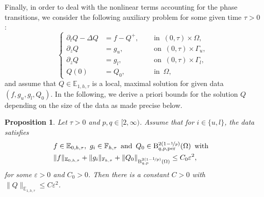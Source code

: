 \documentclass[10pt]{amsart}
\theoremstyle{plain}
\newtheorem{prop}[prop]{Proposition}
\theoremstyle{definition}
\theoremstyle{thm}
\numberwithin{equation}{section}
\newcommand{\rB}{\mathrm{B}}
\newcommand{\E}{\mathbb{E}}
\newcommand{\F}{\mathbb{F}}
\newcommand{\del}{\partial}
\newcommand{\per}{\mathrm{per}}
\newcommand{\dz}{\del_z}
\newcommand{\dt}{\del_t}
\newcommand{\eps}{\varepsilon}
\newcommand{\Gal}{\Gamma_l}
\newcommand{\Gau}{\Gamma_u}
\newcommand{\tand}{\enspace \text{and} \enspace}
\newcommand{\ton}{\enspace \text{on} \enspace}
\newcommand{\tin}{\enspace \text{in} \enspace}
\newcommand{\twith}{\enspace \text{with} \enspace}
\begin{document}
Finally, in order to deal with the nonlinear terms accounting for the phase transitions, we consider the following auxiliary problem for some given time $\tau>0$:
\begin{equation}\label{eq: auxillary for q}
    \left\{
    \begin{aligned}
        \dt Q - \Delta Q
        &= f -Q^+, &&\tin (0,\tau) \times \Omega,\\
        \dz Q
        &= g_u, &&\ton (0,\tau) \times \Gau,\\
       \dz Q
        &= g_l, &&\ton (0,\tau) \times \Gal,\\
        Q(0)
        &= Q_0, &&\tin \Omega,
    \end{aligned}
    \right.
\end{equation}
and assume that $Q \in \E_{1,h,\tau}$ is a local, maximal solution for given data $(f,g_u,g_l,Q_0)$. 
In the following, we derive a priori bounds for the solution $Q$ depending on the size of the data as made precise below.

\begin{prop}
    \label{prop: est on q}
    Let $\tau >0$ and $p,q \in [2,\infty)$. Assume that for $i \in \{ u,l\}$, the data satisfies
    \begin{equation}\label{eq: assu q}
        \begin{aligned}
            &f \in \E_{0,h,\tau}, \ g_i \in \F_{h,\tau}   \tand Q_0 \in \rB_{q,p,\per}^{2(1-\nicefrac{1}{p})}(\Omega) \twith\\
            &\| f \|_{\E_{0,h,\tau}} + \| g_i \|_{\F_{h,\tau}} +\|Q_0 \|_{\rB^{2(1-\nicefrac{1}{p})}_{q,p}(\Omega) } \leq C_0\eps^2 ,
        \end{aligned}
    \end{equation}
    for some $\eps>0$ and $C_0>0$. 
    Then there is a constant $C>0$ with $\| Q \|_{\E_{1,h,\tau}} \leq C \eps^2$.
\end{prop}
\end{document}
